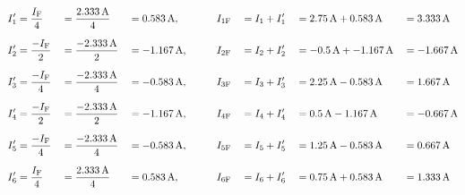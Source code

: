\begin{exemple}
	\begin{alignat*}{7}
		I_1' &= \frac{I_\mathrm{F}}{4} &&=\frac{\qty{2,333}{A}}{4} &&= \qty{0,583}{A}, &&\qquad I_\mathrm{1F} && = I_1 + I_1' &&= \qty{2,75}{A}+\qty{0,583}{A} &&= \qty{3,333}{A} \\[1.5ex]
		I_2' &= \frac{-I_\mathrm{F}}{2} &&=\frac{\qty{-2,333}{A}}{2} &&= \qty{-1,167}{A}, &&\qquad I_\mathrm{2F} && = I_2 + I_2' &&= \qty{-0,5}{A}+\qty{-1,167}{A} &&= \qty{-1,667}{A} \\[1.5ex]
		I_3' &= \frac{-I_\mathrm{F}}{4} &&=\frac{\qty{-2,333}{A}}{4} &&= \qty{-0,583}{A}, &&\qquad I_\mathrm{3F} && = I_3 + I_3' &&= \qty{2,25}{A}-\qty{0,583}{A} &&= \qty{1,667}{A} \\[1.5ex]
		I_4' &= \frac{-I_\mathrm{F}}{2} &&=\frac{\qty{-2,333}{A}}{2} &&= \qty{-1,167}{A}, &&\qquad I_\mathrm{4F} && = I_4 + I_4' &&= \qty{0,5}{A}-\qty{1,167}{A} &&= \qty{-0,667}{A} \\[1.5ex]
		I_5' &= \frac{-I_\mathrm{F}}{4} &&=\frac{\qty{-2,333}{A}}{4} &&= \qty{-0,583}{A}, &&\qquad I_\mathrm{5F} && = I_5 + I_5' &&= \qty{1,25}{A}-\qty{0,583}{A} &&= \qty{0,667}{A} \\[1.5ex]
		I_6' &= \frac{I_\mathrm{F}}{4}  &&=\frac{\qty{2,333}{A}}{4} &&= \qty{0,583}{A}, &&\qquad I_\mathrm{6F} && = I_6 + I_6' &&= \qty{0,75}{A}+\qty{0,583}{A} &&= \qty{1,333}{A}
	\end{alignat*}
\end{exemple}

